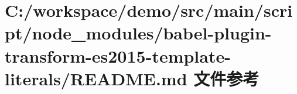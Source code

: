 \hypertarget{node__modules_2babel-plugin-transform-es2015-template-literals_2_r_e_a_d_m_e_8md}{}\section{C\+:/workspace/demo/src/main/script/node\+\_\+modules/babel-\/plugin-\/transform-\/es2015-\/template-\/literals/\+R\+E\+A\+D\+ME.md 文件参考}
\label{node__modules_2babel-plugin-transform-es2015-template-literals_2_r_e_a_d_m_e_8md}
